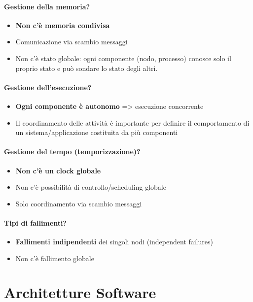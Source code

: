\subsubsection{Gestione della memoria?}
\begin{itemize}
    \item \textbf{Non c'è memoria condivisa}
    \item Comunicazione via scambio messaggi
    \item Non c'è stato globale: ogni componente (nodo, processo) conosce solo il proprio stato e può sondare lo stato degli altri.
\end{itemize}

\subsubsection{Gestione dell'esecuzione?}
\begin{itemize}
    \item \textbf{Ogni componente è autonomo} => esecuzione concorrente
    \item Il coordinamento delle attività è importante per definire il comportamento di un sistema/applicazione costituita da più componenti
\end{itemize}

\subsubsection{Gestione del tempo (temporizzazione)?}
\begin{itemize}
    \item \textbf{Non c'è un clock globale}
    \item Non c'è possibilità di controllo/scheduling globale
    \item Solo coordinamento via scambio messaggi
\end{itemize}

\subsubsection{Tipi di fallimenti?}
\begin{itemize}
    \item \textbf{Fallimenti indipendenti} dei singoli nodi (independent failures)
    \item Non c'è fallimento globale
\end{itemize}

\chapter{Architetture Software}
